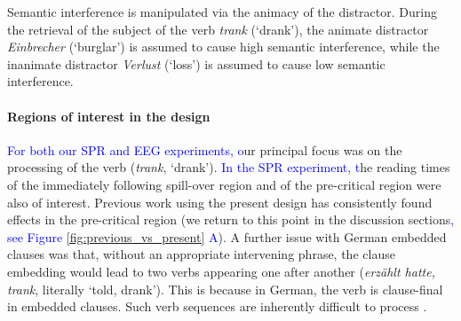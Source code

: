 \documentclass[a4paper, man, floatsintext]{apa7}
\begin{document}
Semantic interference is manipulated via the animacy of the distractor. During the retrieval of the subject of the verb \textit{trank} (`drank'), the animate distractor  \textit{Einbrecher} (`burglar') is assumed to cause high semantic interference, while the inanimate distractor \textit{Verlust} (`loss') is assumed to cause low semantic interference. \label{semantic_features_encoding}

\paragraph{Regions of interest in the design}
\textcolor{blue}{For both our SPR and EEG experiments, o}ur principal focus was on the processing of the verb (\textit{trank}, `drank'). \textcolor{blue}{In the SPR experiment, t}he reading times of the immediately following spill-over region and of the pre-critical region were also of interest. Previous work using the present design \parencite{vandyke07,mertzen} has consistently found effects in the pre-critical region (we return to this point in the discussion sections\textcolor{blue}{, see Figure \ref{fig:previous_vs_present} A}). A further issue with German embedded clauses \parencite[also see][]{mertzen} was that, without an appropriate intervening phrase, the clause embedding would lead to two verbs appearing one after another (\textit{erzählt hatte, trank}, literally `told, drank'). This is because in German, the verb is clause-final in embedded clauses. Such verb sequences are inherently difficult to process \parencite{VSLK11,bach1986crossed}. 
\end{document}

